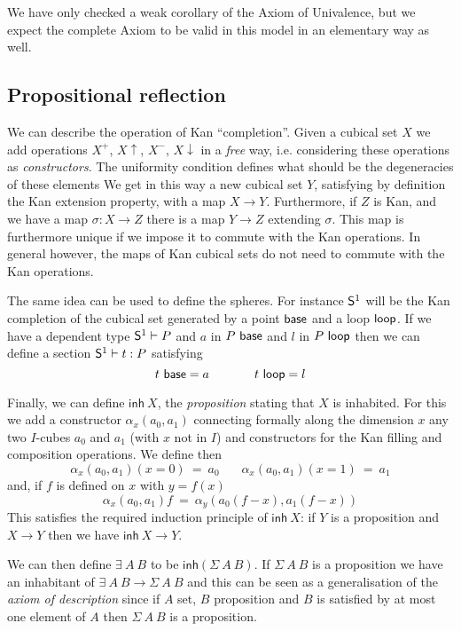 \documentclass[10pt,a4paper]{article}
\newcommand{\inh}{\mathsf{inh}}
\newcommand{\Sph}{{\sf S}^1}
\begin{document}
\medskip

 We have only checked a weak corollary of the Axiom of Univalence, but we expect the complete Axiom to be valid
in this model in an elementary way as well.


\subsection{Propositional reflection}

 We can describe the operation of Kan ``completion''. Given a cubical set $X$ we add
operations $X^+$, $X\uparrow$, $X^-$, $X\downarrow$ in a {\em free} way, i.e.
considering these operations as {\em constructors}.
 The uniformity condition defines what should be the degeneracies of these elements
We get in this way a new cubical set $Y$, satisfying by definition the Kan extension
property, with a map $X\to Y$. Furthermore, if $Z$ is Kan, and we have a map
$\sigma:X\to Z$ there is a map $Y\to Z$ extending $\sigma$.
This map is furthermore unique if we impose
it to commute with the Kan  operations.
In general however, the maps of Kan cubical sets do not need to commute with the Kan operations.

 The same idea can be used to define the spheres. For instance $\Sph$ will be the
Kan completion of the cubical set generated by a point ${\sf base}$ and a loop ${\sf loop}$.
If we have a dependent type $\Sph\vdash P$ and $a$ in $P~{\sf base}$ and $l$ in $P~{\sf loop}$
then we can define a section $\Sph\vdash t:P$ satisfying
$$
t~{\sf base} = a~~~~~~~~~~~t~{\sf loop} = l
$$

 Finally, we can define $\inh~X$, the {\em proposition} stating that $X$ is inhabited.
For this we add a constructor $\alpha_x(a_0,a_1)$ connecting formally along the dimension $x$
any two $I$-cubes  $a_0$ and $a_1$ (with $x$ not in $I$) and constructors for the Kan filling
and composition operations. We define then
$$\alpha_x(a_0,a_1)(x=0) ~=~ a_0~~~~~~~~\alpha_x(a_0,a_1)(x=1) ~=~ a_1$$
and, if $f$ is defined on $x$ with $y=f(x)$
$$\alpha_x(a_0,a_1)f ~=~ \alpha_y(a_0(f-x),a_1(f-x))$$
 This satisfies the required induction principle of $\inh~X$: if $Y$ is a proposition
and $X\to Y$ then we have $\inh~X\to Y$.

 We can then define $\exists~A~B$ to be $\inh(\Sigma~A~B)$. If $\Sigma~A~B$ is a proposition we have
an inhabitant of $\exists~A~B\to \Sigma~ A~B$ and this can be seen as a generalisation of
the {\em axiom of description} since if $A$ set, $B$ proposition and $B$ is satisfied by at most
one element of $A$ then $\Sigma~A~B$ is a proposition.
\end{document}
